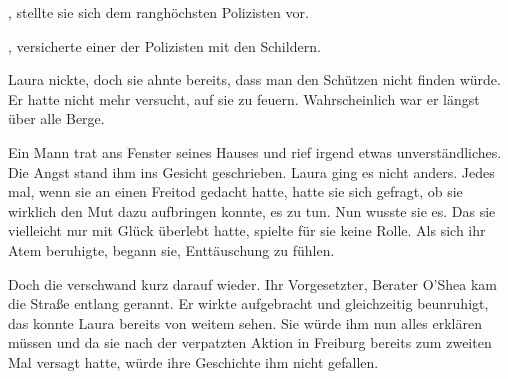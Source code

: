 , stellte sie sich dem ranghöchsten Polizisten vor. 

\par

, versicherte einer der Polizisten mit den Schildern.

\par

Laura nickte, doch sie ahnte bereits, dass man den Schützen nicht finden würde. Er hatte nicht mehr versucht, auf sie zu feuern. Wahrscheinlich war er längst über alle Berge.

\par

Ein Mann trat ans Fenster seines Hauses und rief irgend etwas unverständliches. Die Angst stand ihm ins Gesicht geschrieben. Laura ging es nicht anders. Jedes mal, wenn sie an einen Freitod gedacht hatte, hatte sie sich gefragt, ob sie wirklich den Mut dazu aufbringen konnte, es zu tun. Nun wusste sie es. Das sie vielleicht nur mit Glück überlebt hatte, spielte für sie keine Rolle. Als sich ihr Atem beruhigte, begann sie, Enttäuschung zu fühlen.

\par

Doch die verschwand kurz darauf wieder. Ihr Vorgesetzter, Berater O'Shea kam die Straße entlang gerannt. Er wirkte aufgebracht und gleichzeitig beunruhigt, das konnte Laura bereits von weitem sehen. Sie würde ihm nun alles erklären müssen und da sie nach der verpatzten Aktion in Freiburg bereits zum zweiten Mal versagt hatte, würde ihre Geschichte ihm nicht gefallen.